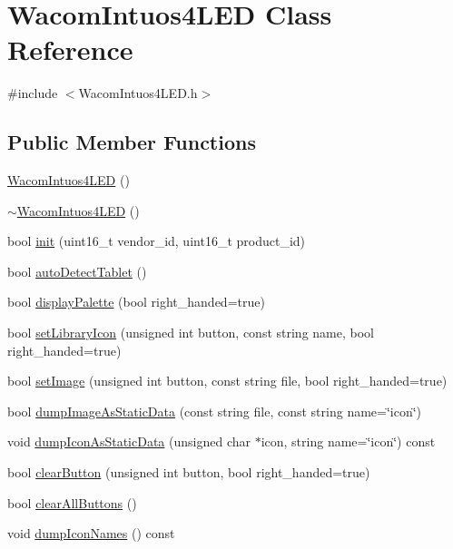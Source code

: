 \hypertarget{classWacomIntuos4LED}{
\section{WacomIntuos4LED Class Reference}
\label{classWacomIntuos4LED}
}


{\ttfamily \#include $<$WacomIntuos4LED.h$>$}

\subsection*{Public Member Functions}
\begin{DoxyCompactItemize}
\item 
\hyperlink{classWacomIntuos4LED_ab82e3d77651bd8e8e005438c74e2c83a}{WacomIntuos4LED} ()
\item 
\hyperlink{classWacomIntuos4LED_a05ed50e7a3d0e2c1a1fbee79242ae533}{$\sim$WacomIntuos4LED} ()
\item 
bool \hyperlink{classWacomIntuos4LED_adc3cd37e5820009183b5fa43578c2e76}{init} (uint16\_\-t vendor\_\-id, uint16\_\-t product\_\-id)
\item 
bool \hyperlink{classWacomIntuos4LED_a8340cff52f439a898b628072769e6459}{autoDetectTablet} ()
\item 
bool \hyperlink{classWacomIntuos4LED_a504a9363724b045d3cad0e98e19f529e}{displayPalette} (bool right\_\-handed=true)
\item 
bool \hyperlink{classWacomIntuos4LED_a8d9cb89c7bcb3a718d23f63e314248d3}{setLibraryIcon} (unsigned int button, const string name, bool right\_\-handed=true)
\item 
bool \hyperlink{classWacomIntuos4LED_af4991024e32c329e052633a286cb85ba}{setImage} (unsigned int button, const string file, bool right\_\-handed=true)
\item 
bool \hyperlink{classWacomIntuos4LED_af2dd2a695a643156dbc2cdd1b3023fcd}{dumpImageAsStaticData} (const string file, const string name=\char`\"{}icon\char`\"{})
\item 
void \hyperlink{classWacomIntuos4LED_a67ea348323f7e7ed8056c228ea02a552}{dumpIconAsStaticData} (unsigned char $\ast$icon, string name=\char`\"{}icon\char`\"{}) const 
\item 
bool \hyperlink{classWacomIntuos4LED_a2d8ec01dc643ae0bb4af01fc7b73b363}{clearButton} (unsigned int button, bool right\_\-handed=true)
\item 
bool \hyperlink{classWacomIntuos4LED_a4f180fc041b1bdc7cd700c588b1e646e}{clearAllButtons} ()
\item 
void \hyperlink{classWacomIntuos4LED_ad4e26d11fdf1978059b984780dd9f7e9}{dumpIconNames} () const 
\end{DoxyCompactItemize}
